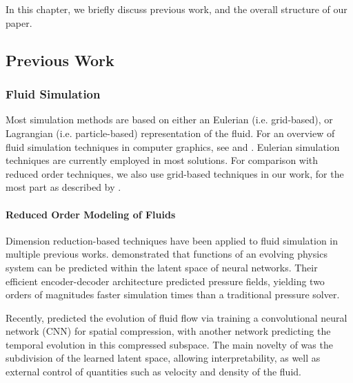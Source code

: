 \chapter{\bevezetes}

In this chapter, we briefly discuss previous work, and the overall structure
of our paper. 


\section{Previous Work}
\subsection{Fluid Simulation}
Most simulation methods are based on either an Eulerian (i.e.  grid-based), or
Lagrangian (i.e. particle-based) representation of the fluid.  For an overview
of fluid simulation techniques in computer graphics, see \cite{FluidNotes} and
\cite{BridsonFluid}.  Eulerian simulation techniques are currently employed in
most solutions. For comparison with reduced order techniques, we also use
grid-based techniques in our work, for the most part as described by
\cite{StableFluids}.


\subsubsection*{Reduced Order Modeling of Fluids}
Dimension reduction-based techniques have been applied to fluid simulation in
multiple previous works. \cite{Wiewel2019LatentSP} demonstrated that functions
of an evolving physics system can be predicted within the latent space of neural
networks. Their efficient encoder-decoder architecture predicted pressure
fields, yielding two orders of magnitudes faster simulation times than
a traditional pressure solver.

Recently, \cite{LatentSpaceSubdivision} predicted the
evolution of fluid flow via training a convolutional neural network (CNN) for
spatial compression, with another network predicting the temporal evolution in
this compressed subspace.  The main novelty of \cite{LatentSpaceSubdivision} was
the subdivision of the learned latent space, allowing interpretability, as well
as external control of quantities such as velocity and density of the fluid.


